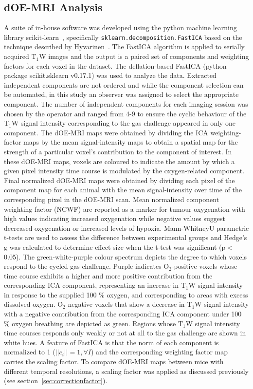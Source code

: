 \subsection{\ac{dOE-MRI} Analysis}
A suite of in-house software was developed using the python machine learning library scikit-learn~\cite{Pedregosa:2011tv}, specifically \texttt{sklearn.decomposition.Fast\ac{ICA}} based on the technique described by Hyvarinen~\cite{Hyvarinen:2000vk}.
The Fast\ac{ICA} algorithm is applied to serially acquired T$_1$W images and the output is a paired set of components and weighting factors for each voxel in the dataset.
The deflation-based Fast\ac{ICA} (python package scikit.sklearn v0.17.1) was used to analyze the data. 
Extracted independent components are not ordered and while the component selection can be automated, in this study an observer was assigned to select the appropriate component.
The number of independent components for each imaging session was chosen by the operator and ranged from 4-9 to ensure the cyclic behaviour of the T$_1$W signal intensity corresponding to the gas challenge appeared in only one component. 
The \ac{dOE-MRI} maps were obtained by dividing the \ac{ICA} weighting-factor maps by the mean signal-intensity maps to obtain a spatial map for the strength of a particular voxel's contribution to the component of interest.
In these \ac{dOE-MRI} maps, voxels are coloured to indicate the amount by which a given pixel intensity time course is modulated by the oxygen-related component. 
Final normalized \ac{dOE-MRI} maps were obtained by dividing each pixel of the component map for each animal with the mean signal-intensity over time of the corresponding pixel in the \ac{dOE-MRI} scan. 
Mean normalized component weighting factor (\acs{NCWF}) are reported as a marker for tumour oxygenation with high values indicating increased oxygenation while negative values suggest decreased oxygenation or increased levels of hypoxia. 
Mann-WhitneyU parametric t-tests are used to assess the difference between experimental groups and Hedge's g was calculated to determine effect size when the t-test was significant (p$<$0.05).
The green-white-purple colour spectrum depicts the degree to which voxels respond to the cycled gas challenge.
Purple indicates O$_2$-positive voxels whose time course exhibits a higher and more positive contribution from the corresponding \ac{ICA} component, representing an increase in T$_1$W signal intensity in response to the supplied 100 \% oxygen, and corresponding to areas with excess dissolved oxygen.
O$_2$-negative voxels that show a decrease in T$_1$W signal intensity with a negative contribution from the corresponding \ac{ICA} component under 100 \% oxygen breathing are depicted as green. 
Regions whose T$_1$W signal intensity time courses responds only weakly or not at all to the gas challenge are shown in white hues.
A feature of Fast\ac{ICA} is that the norm of each component is normalized to 1 ($||c_i||=1, \forall I$) and the corresponding weighting factor map carries the scaling factor.
To compare \ac{dOE-MRI} maps between mice with different temporal resolutions, a scaling factor was applied as discussed previously (see section~\ref{sec:correctionfactor}).

